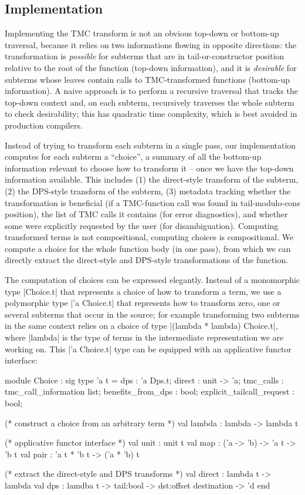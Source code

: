 \subsection{Implementation} \label{subsec:implementation} Implementing the TMC transform is not an obvious top-down or bottom-up traversal, because it relies on two informations flowing in opposite directions: the transformation is \emph{possible} for subterms that are in tail-or-constructor position relative to the root of the function (top-down information), and it is \emph{desirable} for subterms whose leaves contain calls to TMC-transformed functions (bottom-up information). A naive approach is to perform a recursive traversal that tracks the top-down context and, on each subterm, recursively traverses the whole subterm to check desirability; this has quadratic time complexity, which is best avoided in production compilers.

Instead of trying to transform each subterm in a single pass, our implementation computes for each subterm a ``choice'', a summary of all the bottom-up information relevant to choose how to transform it -- once we have the top-down information available. This includes (1) the direct-style transform of the subterm, (2) the DPS-style transform of the subterm, (3) metadata tracking whether the transformation is beneficial (if a TMC-function call was found in tail-modulo-cons position), the list of TMC calls it contains (for error diagnostics), and whether some were explicitly requested by the user (for disambiguation). Computing transformed terms is not compositional, computing choices is compositional. We compute a choice for the whole function body (in one pass), from which we can directly extract the direct-style and DPS-style transformations of the function.

The computation of choices can be expressed elegantly. Instead of a monomorphic type \ocaml|Choice.t| that represents a choice of how to transform a term, we use a polymorphic type \ocaml|'a Choice.t| that represents how to transform zero, one or several subterms that occur in the source; for example transforming two subterms in the same context relies on a choice of type \ocaml|(lambda * lambda) Choice.t|, where \ocaml|lambda| is the type of terms in the intermediate representation we are working on. This \ocaml|'a Choice.t| type can be equipped with an applicative functor interface:
\begin{Ocaml}
module Choice : sig
  type 'a t = {
    dps : 'a Dps.t;
    direct : unit -> 'a;
    tmc_calls : tmc_call_information list;
    benefits_from_dps : bool;
    explicit_tailcall_request : bool;
  }

  (* construct a choice from an arbitrary term *)
  val lambda : lambda -> lambda t

  (* applicative functor interface *)
  val unit : unit t
  val map : ('a -> 'b) -> 'a t -> 'b t
  val pair : 'a t * 'b t -> ('a * 'b) t

  (* extract the direct-style and DPS transforms *)
  val direct : lambda t -> lambda
  val dps : lamdba t -> tail:bool -> dst:offset destination -> 'd
end
\end{Ocaml}

